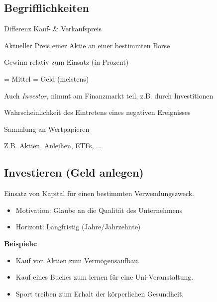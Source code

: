 \documentclass{beamer}
\begin{document}
		\begin{frame}
		\end{frame}
	
		\subsection{Begrifflichkeiten}
		
		\begin{frame}
			\begin{description}[labelwidth=0cm]
				\item[Gewinn/Verlust] Differenz Kauf- \& Verkaufspreis\pause
				\item[Kurs] Aktueller Preis einer Aktie an einer bestimmten Börse\pause
				\item[Rendite] Gewinn relativ zum Einsatz (in Prozent)\pause
				\item[Kapital] = Mittel = Geld (meistens)\pause
				\item[Anleger] Auch \textit{Investor}, nimmt am Finanzmarkt teil, z.B. durch Investitionen\pause
				\item[Risiko] Wahrscheinlichkeit des Eintretens eines negativen Ereignisses\pause
				\item[Portfolio] Sammlung an Wertpapieren
				\item[Wertpapier] Z.B. Aktien, Anleihen, ETFs, ...
			\end{description}
		\end{frame}
		
		\subsection{Investieren (Geld anlegen)}
		
			\begin{frame}
				\begin{definition}
					Einsatz von Kapital für einen bestimmten Verwendungszweck.\citewiki{Investition}
				\end{definition}
				\begin{itemize}
					\item Motivation: Glaube an die Qualität des Unternehmens
					\item Horizont: Langfristig (Jahre/Jahrzehnte)
				\end{itemize}\n
				\textbf{Beispiele:}
				\begin{itemize}
					\item Kauf von Aktien zum Vermögensaufbau.
					\item Kauf eines Buches zum lernen für eine Uni-Veranstaltung.
					\item Sport treiben zum Erhalt der körperlichen Gesundheit.
				\end{itemize}
			\end{frame}
		
\end{document}
